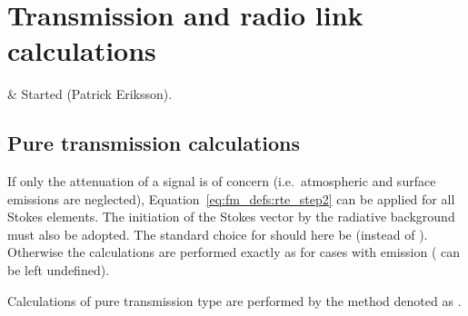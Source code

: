 \chapter{Transmission and radio link calculations}
 \label{sec:trans}


  & Started (Patrick Eriksson).\\
 \stophistory


\section{Pure transmission calculations}
\label{sec:fm_defs:transmission}

If only the attenuation of a signal is of concern (i.e.\ atmospheric and
surface emissions are neglected), Equation~\ref{eq:fm_defs:rte_step2} can be
applied for all Stokes elements. The initiation of the Stokes vector by the
radiative background must also be adopted. The standard choice for
 should here be 
(instead of ). Otherwise the calculations are performed
exactly as for cases with emission (
can be left undefined).

Calculations of pure transmission type are performed by the method denoted as
.



